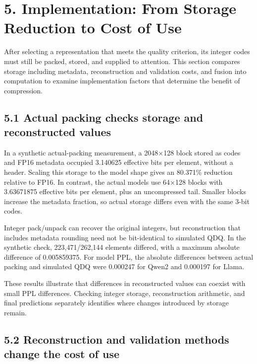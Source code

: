 \documentclass[10pt,a4paper]{article}
\begin{document}
\section{5. Implementation: From Storage Reduction to Cost of Use}\label{implementation-from-storage-reduction-to-cost-of-use}

After selecting a representation that meets the quality criterion, its integer codes must still be packed, stored, and supplied to attention. This section compares storage including metadata, reconstruction and validation costs, and fusion into computation to examine implementation factors that determine the benefit of compression.

\subsection{5.1 Actual packing checks storage and reconstructed values}\label{actual-packing-checks-storage-and-reconstructed-values}

In a synthetic actual-packing measurement, a 2048×128 block stored as codes and FP16 metadata occupied 3.140625 effective bits per element, without a header. Scaling this storage to the model shape gives an 80.371\% reduction relative to FP16. In contrast, the actual models use 64×128 blocks with 3.63671875 effective bits per element, plus an uncompressed tail. Smaller blocks increase the metadata fraction, so actual storage differs even with the same 3-bit codes.

Integer pack/unpack can recover the original integers, but reconstruction that includes metadata rounding need not be bit-identical to simulated QDQ. In the synthetic check, 223,471/262,144 elements differed, with a maximum absolute difference of 0.005859375. For model PPL, the absolute differences between actual packing and simulated QDQ were 0.000247 for Qwen2 and 0.000197 for Llama.

These results illustrate that differences in reconstructed values can coexist with small PPL differences. Checking integer storage, reconstruction arithmetic, and final predictions separately identifies where changes introduced by storage remain.

\subsection{5.2 Reconstruction and validation methods change the cost of use}\label{reconstruction-and-validation-methods-change-the-cost-of-use}
\end{document}
